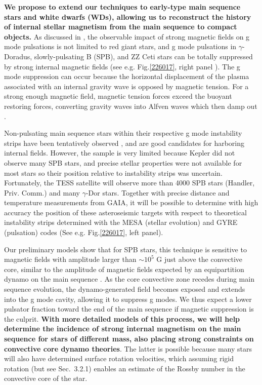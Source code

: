 \textbf{ We propose to extend our techniques to early-type main sequence stars and white dwarfs (WDs), allowing us to reconstruct the history of internal stellar magnetism from the main sequence to compact objects.} As discussed in \citet{Cantiello_2016}, the observable impact of strong magnetic fields on g mode pulsations is not limited to red giant stars, and g mode pulsations in $\gamma$-Doradus, slowly-pulsating B (SPB), and ZZ Ceti stars can be totally suppressed by strong internal magnetic fields (see e.g. Fig.\ref{226017}, right panel ). {\color{green} The g mode suppression can occur because the horizontal displacement of the plasma associated with an internal gravity wave is opposed by magnetic tension. For a strong enough magnetic field, magnetic tension forces exceed the buoyant restoring forces, converting gravity waves into Alfven waves which then damp out \cite{lecoanet:17}.}

Non-pulsating main sequence stars within their respective g mode instability strips have been tentatively observed \citep{Balona_2011}, and are good candidates for harboring internal fields.
However, the sample is very limited because Kepler did not observe many SPB stars, and precise stellar properties were not available for most stars so their position relative to instability strips was uncertain. Fortunately, the TESS satellite will observe more than 4000 SPB stars (Handler, Priv. Comm.) and many $\gamma$-Dor stars. Together with precise distance and temperature measurements from GAIA, it will be possible to determine with high accuracy the position of these asteroseismic targets with respect to theoretical instability strips determined with the MESA (stellar evolution) and GYRE (pulsation) codes (See e.g. Fig.\ref{226017}, left panel). 

Our preliminary models show that for SPB stars, this technique is sensitive to magnetic fields with amplitude larger than $\sim \! 10^5$ G just above the convective core, similar to the amplitude of magnetic fields expected by an equipartition dynamo on the main sequence \citep[See e.g.][]{Featherstone_2009,Augustson_2016}. As the core convective zone recedes during main sequence evolution, the dynamo-generated field becomes exposed and extends into the g mode cavity, allowing it to suppress g modes. We thus expect a lower pulsator fraction toward the end of the main sequence if magnetic suppression is the culprit. \textbf{With more detailed models of this process, we will help determine the incidence of strong internal magnetism on the main sequence for stars of different mass, also placing strong constraints on convective core dynamo theories}. {\color{green} The latter is possible because many stars will also have determined surface rotation velocities, which assuming rigid rotation (but see Sec.~3.2.1) enables an estimate of the Rossby number in the convective core of the star.}


